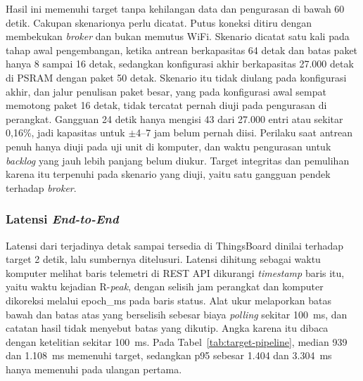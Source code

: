 Hasil ini memenuhi target tanpa kehilangan data dan pengurasan di bawah 60 detik. Cakupan skenarionya perlu dicatat. Putus koneksi ditiru dengan membekukan \textit{broker} dan bukan memutus WiFi. Skenario dicatat satu kali pada tahap awal pengembangan, ketika antrean berkapasitas 64 detak dan batas paket hanya 8 sampai 16 detak, sedangkan konfigurasi akhir berkapasitas 27.000 detak di PSRAM dengan paket 50 detak. Skenario itu tidak diulang pada konfigurasi akhir, dan jalur penulisan paket besar, yang pada konfigurasi awal sempat memotong paket 16 detak, tidak tercatat pernah diuji pada pengurasan di perangkat. Gangguan 24 detik hanya mengisi 43 dari 27.000 entri atau sekitar 0,16\%, jadi kapasitas untuk $\pm$4--7 jam belum pernah diisi. Perilaku saat antrean penuh hanya diuji pada uji unit di komputer, dan waktu pengurasan untuk \textit{backlog} yang jauh lebih panjang belum diukur. Target integritas dan pemulihan karena itu terpenuhi pada skenario yang diuji, yaitu satu gangguan pendek terhadap \textit{broker}.

\subsubsection{Latensi \textit{End-to-End}}

Latensi dari terjadinya detak sampai tersedia di ThingsBoard dinilai terhadap target 2 detik, lalu sumbernya ditelusuri. Latensi dihitung sebagai waktu komputer melihat baris telemetri di REST API dikurangi \textit{timestamp} baris itu, yaitu waktu kejadian R-\textit{peak}, dengan selisih jam perangkat dan komputer dikoreksi melalui epoch\_ms pada baris status. Alat ukur melaporkan batas bawah dan batas atas yang berselisih sebesar biaya \textit{polling} sekitar 100~ms, dan catatan hasil tidak menyebut batas yang dikutip. Angka karena itu dibaca dengan ketelitian sekitar 100~ms. Pada Tabel~\ref{tab:target-pipeline}, median 939 dan 1.108~ms memenuhi target, sedangkan p95 sebesar 1.404 dan 3.304~ms hanya memenuhi pada ulangan pertama.

